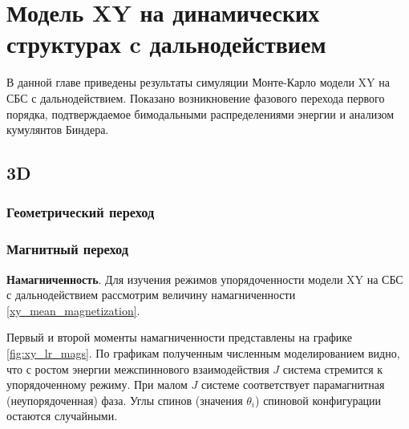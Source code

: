 
\chapter{Модель XY на динамических структурах c дальнодействием}
\label{ch:ch5}
В данной главе приведены результаты симуляции Монте-Карло  модели  XY на СБС с дальнодействием.  Показано возникновение фазового перехода первого порядка, подтверждаемое бимодальными распределениями энергии и анализом  кумулянтов Биндера. 


\section{3D} 
\subsection{Геометрический переход}





\subsection{Магнитный переход}

\textbf{Намагниченность}.  Для изучения режимов упорядоченности модели XY на СБС с дальнодействием рассмотрим величину намагниченности \eqref{xy_mean_magnetization}. 

Первый и второй моменты намагниченности  представлены на графике \ref{fig:xy_lr_mags}. По графикам полученным численным моделированием видно, что с ростом энергии межспиннового взаимодействия $J$ система стремится к упорядоченному режиму. При малом  $J$ системе соответствует  парамагнитная (неупорядоченная)  фаза. Углы спинов (значения $\theta_i$) спиновой конфигурации остаются случайными.

